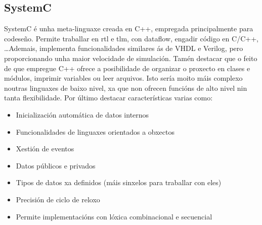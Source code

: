 \subsection{SystemC}\label{sec:imp_systemC}
SystemC é unha meta-linguaxe creada en C++, empregada principalmente para codeseño. Permite traballar en \acrshort{rtl} e \acrshort{tlm},  con dataflow, engadir código en C/C++, \dots  Ademais, implementa funcionalidades similares ás de \acrshort{VHDL} e Verilog, pero proporcionando unha maior velocidade de simulación. Tamén destacar que o feito de que empregue C++ ofrece a posibilidade de organizar o proxecto en clases e módulos, imprimir variables ou leer arquivos. Isto sería moito máis complexo noutras linguaxes de baixo nivel, xa que non ofrecen funcións de alto nivel nin tanta flexibilidade. Por último destacar características varias como: \begin{itemize}
    \item Inicialización automática de datos internos
    \item Funcionalidades de linguaxes orientados a obxectos
    \item Xestión de eventos
    \item Datos públicos e privados
    \item Tipos de datos xa definidos (máis sinxelos para traballar con eles)
    \item Precisión de ciclo de reloxo
    \item Permite implementacións con lóxica combinacional e secuencial
\end{itemize} 



